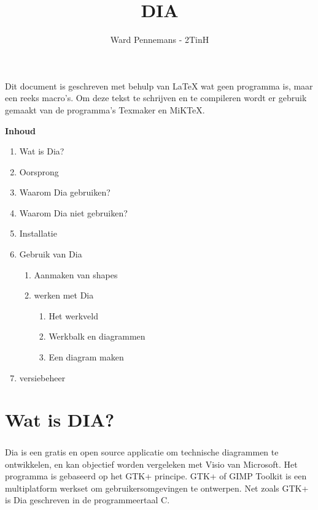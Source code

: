 \documentclass[12pt,a4paper]{report}
\begin{document}
\title{DIA}
\author{Ward Pennemans - 2TinH}
\maketitle

\begin{flushleft}

Dit document is geschreven met behulp van \LaTeX{} wat geen programma is, maar een reeks macro's. Om deze tekst te schrijven en te compileren wordt er gebruik gemaakt van de programma's Texmaker en MiKTeX.

\newpage

\begin{center}
\begin{LARGE}
\textbf{Inhoud}
\end{LARGE}		
\end{center}
\begin{enumerate}
\item Wat is Dia?
\item Oorsprong
\item Waarom Dia gebruiken?
\item Waarom Dia niet gebruiken?
\item Installatie
\item Gebruik van Dia
\begin{enumerate}
\item Aanmaken van shapes
\item werken met Dia
\begin{enumerate}
\item Het werkveld
\item Werkbalk en diagrammen
\item Een diagram maken
\end{enumerate}
\end{enumerate}
\item versiebeheer
\end{enumerate}

\newpage

\chapter{Wat is DIA?}
\paragraph*{}
Dia is een gratis en open source applicatie om technische diagrammen te ontwikkelen, en kan objectief worden vergeleken met Visio van Microsoft. Het programma is gebaseerd op het GTK+ principe. GTK+ of GIMP Toolkit is een multiplatform werkset om gebruikersomgevingen te ontwerpen. Net zoals GTK+ is Dia geschreven in de programmeertaal C. 

\end{flushleft}
\end{document}
